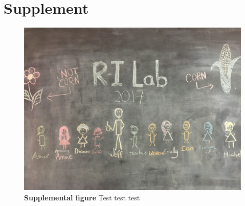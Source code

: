 \documentclass[9pt,twocolumn,twoside]{rilabRxiv}
\newcommand{\beginsupplement}{%
        \setcounter{table}{0}
        \renewcommand{\thetable}{S\arabic{table}}%
        \setcounter{figure}{0}
        \renewcommand{\thefigure}{S\arabic{figure}}%
     }
\begin{document}
\onecolumn
\section*{Supplement}


     
\beginsupplement


\blindtext
\begin{figure}[h!]
\includegraphics[width=.9\linewidth]{figures/lab_group.png}
\caption{\textbf{Supplemental figure} Test test test}
\label{fig:S1}
\end{figure}
\pagebreak
\end{document}

